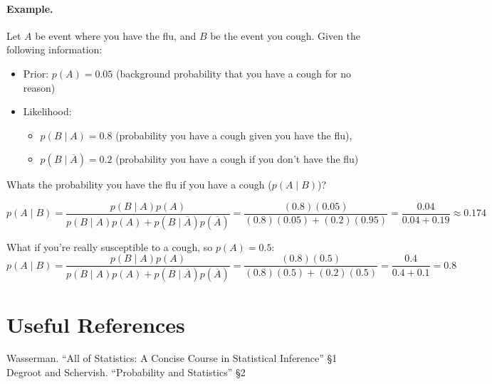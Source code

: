 \paragraph{Example.} 
Let $A$ be event where you have the flu, and $B$ be the event you cough. 
Given the following information: 
\begin{itemize}
\item[] Prior: $p(A)=0.05$ (background probability that you have a cough for no reason)
\item[] Likelihood:
\begin{itemize} 
\item $p(B\mid A) = 0.8$ (probability you have a cough given you have the flu), 
\item $p(B\mid \overline A) = 0.2$ (probability you have a cough if you don't have the flu)
\end{itemize}
\end{itemize}
Whats the probability you have the flu if you have a cough ($p(A\mid B)$)?

\[p(A\mid B) = \frac{p(B\mid A)p(A)}{p(B\mid A)p(A) + p(B\mid \overline A)p(\overline A)} = \frac{(0.8)(0.05)}{(0.8)(0.05)+(0.2)(0.95)}=\frac{0.04}{0.04+0.19}\approx 0.174\]

What if you're really susceptible to a cough, so $p(A)=0.5$:
\[p(A\mid B) = \frac{p(B\mid A)p(A)}{p(B\mid A)p(A) + p(B\mid \overline A)p(\overline A)} = \frac{(0.8)(0.5)}{(0.8)(0.5)+(0.2)(0.5)}=\frac{0.4}{0.4+0.1}=0.8\]

\section*{Useful References}
Wasserman. ``All of Statistics: A Concise Course in Statistical Inference'' \S 1 
Degroot and Schervish. ``Probability and Statistics'' \S 2



